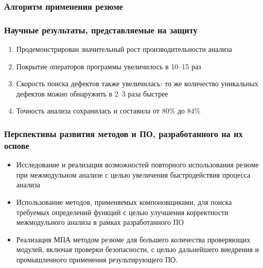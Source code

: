 \documentclass[hyperref={pdfpagelabels=false},10pt]{beamer}
\begin{document}
\begin{frame}
\frametitle{Алгоритм применения резюме}
\begin{figure}[h]
\end{figure}
\end{frame}

\begin{frame}[allowframebreaks]
\frametitle{Научные результаты, представляемые на защиту}
\begin{enumerate}
  \item Продемонстрирован значительный рост производительности анализа
  \item Покрытие операторов программы увеличилось в 10--15 раз
  \item Скорость поиска дефектов также увеличилась: то же количество уникальных дефектов можно обнаружить в 2--3 раза быстрее
  \item Точность анализа сохранилась и составила от 80\% до 84\%
\end{enumerate}
\end{frame}
\begin{frame}
\frametitle{Перспективы развития методов и ПО, разработанного на их основе}
\begin{itemize}
  \item Исследование и реализация возможностей повторного использования резюме при межмодульном анализе с целью увеличения быстродействия процесса анализа
  \item Использование методов, применяемых компоновщиками, для поиска требуемых определений функций с целью улучшения корректности межмодульного анализа в рамках разработанного ПО
  \item Реализация МПА методом резюме для большего количества проверяющих модулей, включая проверки безопасности, с целью дальнейшего внедрения и промышленного применения результирующего ПО. 
\end{itemize}
\end{frame}
\end{document}
